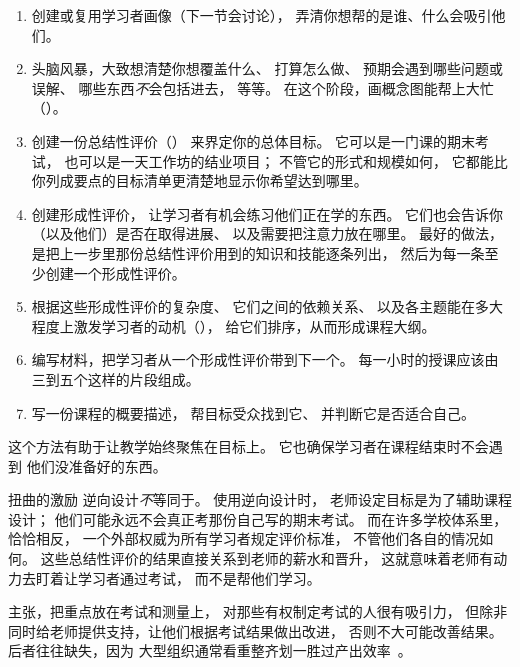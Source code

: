 \begin{enumerate}

\item
  创建或复用学习者画像（下一节会讨论），
  弄清你想帮的是谁、什么会吸引他们。

\item
  头脑风暴，大致想清楚你想覆盖什么、
  打算怎么做、
  预期会遇到哪些问题或误解、
  哪些东西\emph{不}会包括进去，
  等等。
  在这个阶段，画概念图能帮上大忙（）。

\item
  创建一份总结性评价（）
  来界定你的总体目标。
  它可以是一门课的期末考试，
  也可以是一天工作坊的结业项目；
  不管它的形式和规模如何，
  它都能比你列成要点的目标清单更清楚地显示你希望达到哪里。

\item
  创建形成性评价，
  让学习者有机会练习他们正在学的东西。
  它们也会告诉你（以及他们）是否在取得进展、
  以及需要把注意力放在哪里。
  最好的做法，是把上一步里那份总结性评价用到的知识和技能逐条列出，
  然后为每一条至少创建一个形成性评价。

\item
  根据这些形成性评价的复杂度、
  它们之间的依赖关系、
  以及各主题能在多大程度上激发学习者的动机（），
  给它们排序，从而形成课程大纲。

\item
  编写材料，把学习者从一个形成性评价带到下一个。
  每一小时的授课应该由三到五个这样的片段组成。

\item
  写一份课程的概要描述，
  帮目标受众找到它、
  并判断它是否适合自己。

\end{enumerate}

这个方法有助于让教学始终聚焦在目标上。
它也确保学习者在课程结束时不会遇到
他们没准备好的东西。

\begin{aside}{扭曲的激励}
  逆向设计\emph{不}等同于。
  使用逆向设计时，
  老师设定目标是为了辅助课程设计；
  他们可能永远不会真正考那份自己写的期末考试。
  而在许多学校体系里，
  恰恰相反，
  一个外部权威为所有学习者规定评价标准，
  不管他们各自的情况如何。
  这些总结性评价的结果直接关系到老师的薪水和晋升，
  这就意味着老师有动力去盯着让学习者通过考试，
  而不是帮他们学习。

  \cite{Gree2014}主张，把重点放在考试和测量上，
  对那些有权制定考试的人很有吸引力，
  但除非同时给老师提供支持，让他们根据考试结果做出改进，
  否则不大可能改善结果。
  后者往往缺失，因为
  大型组织通常看重整齐划一胜过产出效率~\cite{Scot1998}。
\end{aside}

